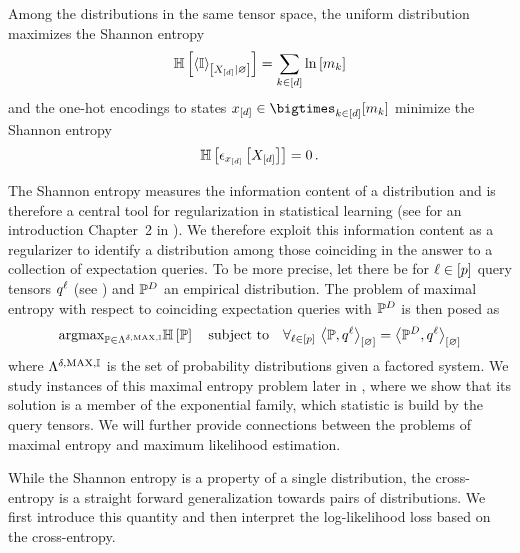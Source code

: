 Among the distributions in the same tensor space, the uniform distribution maximizes the Shannon entropy
\begin{align*}
    \mathbb{H}\left[\left\langle \mathbb{I}\right\rangle_{\left[ X_{[d]} | \varnothing \right]}\right] = \sum_{k\in[d]}\ln \left[ m_{k} \right]
\end{align*}
and the one-hot encodings to states $\shortcatindicesin$ minimize the Shannon entropy
\begin{align*}
    \mathbb{H}\left[\epsilon_{x_{[d]}}\left[X_{[d]}\right]\right] = 0 \, .
\end{align*}

The Shannon entropy measures the information content of a distribution and is therefore a central tool for regularization in statistical learning (see for an introduction Chapter~2 in \cite{mackay_information_2003}).
We therefore exploit this information content as a regularizer to identify a distribution among those coinciding in the answer to a collection of expectation queries.
To be more precise, let there be for $\ell\in[p]$ query tensors $q^{\ell}$ (see ) and $\mathbb{P}^{D}$ an empirical distribution.
The problem of maximal entropy with respect to coinciding expectation queries with $\mathbb{P}^{D}$ is then posed as
\begin{align*}
    \mathrm{argmax}_{\mathbb{P}\in\Lambda^{\delta,\mathrm{MAX},\mathbb{I}}} \mathbb{H}\left[\mathbb{P}\right] \quad \text{subject to} \quad \forall_{\ell\in[p]} \,\, {\left\langle \mathbb{P},q^{\ell}\right\rangle_{\left[ \varnothing \right]} = \left\langle \mathbb{P}^{D},q^{\ell}\right\rangle_{\left[ \varnothing \right]}}
\end{align*}
where $\Lambda^{\delta,\mathrm{MAX},\mathbb{I}}$ is the set of probability distributions given a factored system.
We study instances of this maximal entropy problem later in , where we show that its solution is a member of the exponential family, which statistic is build by the query tensors.
We will further provide connections between the problems of maximal entropy and maximum likelihood estimation.

While the Shannon entropy is a property of a single distribution, the cross-entropy is a straight forward generalization towards pairs of distributions.
We first introduce this quantity and then interpret the log-likelihood loss based on the cross-entropy.

